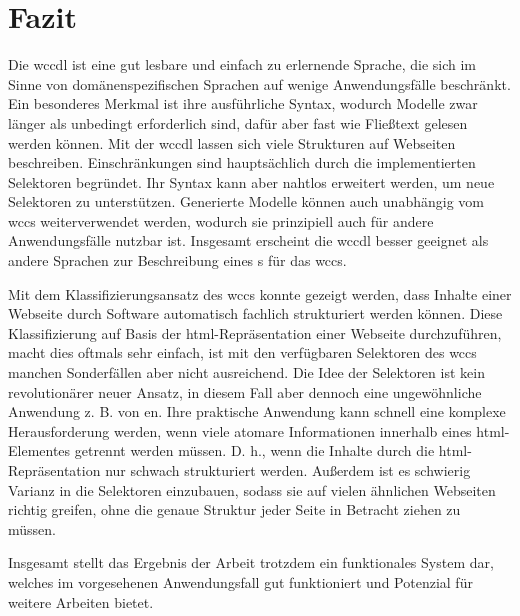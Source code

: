 \section{Fazit}
    Die \gls{wccdl} ist eine gut lesbare und einfach zu erlernende Sprache,
    die sich im Sinne von domänenspezifischen Sprachen
    auf wenige Anwendungsfälle beschränkt.
    Ein besonderes Merkmal ist ihre ausführliche Syntax,
    wodurch Modelle zwar länger als unbedingt erforderlich sind,
    dafür aber fast wie Fließtext gelesen werden können.
    Mit der \gls{wccdl} lassen sich viele Strukturen auf Webseiten beschreiben.
    Einschränkungen sind hauptsächlich durch die implementierten Selektoren begründet.
    Ihr Syntax kann aber nahtlos erweitert werden, um neue Selektoren zu unterstützen.
    Generierte Modelle können auch unabhängig vom \gls{wccs} weiterverwendet werden,
    wodurch sie prinzipiell auch für andere Anwendungsfälle nutzbar ist.
    Insgesamt erscheint die \gls{wccdl} besser geeignet als andere Sprachen
    zur Beschreibung eines {\classificationModel}s für das \gls{wccs}.

    Mit dem Klassifizierungsansatz des \gls{wccs} konnte gezeigt werden,
    dass Inhalte einer Webseite durch Software automatisch fachlich strukturiert werden können.
    Diese Klassifizierung auf Basis der \gls{html}-Repräsentation einer Webseite durchzuführen,
    macht dies oftmals sehr einfach, ist mit den verfügbaren Selektoren des \gls{wccs}
    manchen Sonderfällen aber nicht ausreichend.
    Die Idee der Selektoren ist kein revolutionärer neuer Ansatz,
    in diesem Fall aber dennoch eine ungewöhnliche Anwendung z. B. von {\cssSelector}en.
    Ihre praktische Anwendung kann schnell eine komplexe Herausforderung werden,
    wenn viele atomare Informationen innerhalb eines \gls{html}-Elementes getrennt werden müssen.
    D. h., wenn die Inhalte durch die \gls{html}-Repräsentation nur schwach strukturiert werden.
    Außerdem ist es schwierig Varianz in die Selektoren einzubauen,
    sodass sie auf vielen ähnlichen Webseiten richtig greifen,
    ohne die genaue Struktur jeder Seite in Betracht ziehen zu müssen.

    Insgesamt stellt das Ergebnis der Arbeit trotzdem ein funktionales System dar,
    welches im vorgesehenen Anwendungsfall gut funktioniert
    und Potenzial für weitere Arbeiten bietet.
